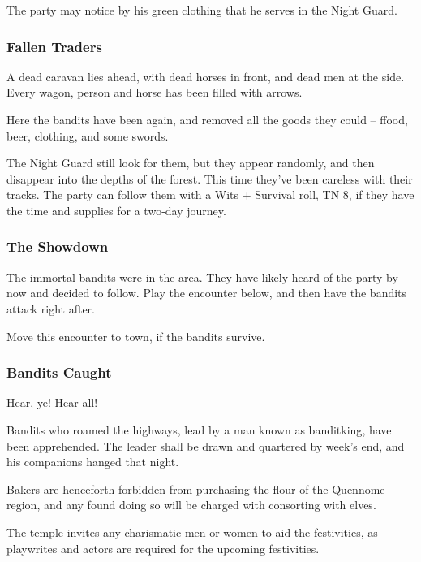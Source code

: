 The party may notice by his green clothing that he serves in the Night Guard.

\zombie

\subsubsection{Fallen Traders}

\begin{boxtext}
	A dead caravan lies ahead, with dead horses in front, and dead men at the side.  Every wagon, person and horse has been filled with arrows.
\end{boxtext}

Here the bandits have been again, and removed all the goods they could -- ffood, beer, clothing, and some swords.

The Night Guard still look for them, but they appear randomly, and then disappear into the depths of the forest.  This time they've been careless with their tracks.  The party can follow them with a Wits + Survival roll, TN 8, if they have the time and supplies for a two-day journey.

\subsubsection{The Showdown}
The immortal bandits were in the area.  They have likely heard of the party by now and decided to follow.  Play the encounter below, and then have the bandits attack right after.

\humansoldier

Move this encounter to town, if the bandits survive.

\subsubsection{Bandits Caught}


\begin{boxtext}
	Hear, ye!  Hear all!

	Bandits who roamed the highways, lead by a man known as \gls{banditking}, have been apprehended.  The leader shall be drawn and quartered by week's end, and his companions hanged that night.

	Bakers are henceforth forbidden from purchasing the flour of the Quennome region, and any found doing so will be charged with consorting with elves.

	The temple invites any charismatic men or women to aid the festivities, as playwrites and actors are required for the upcoming festivities.

\end{boxtext}

